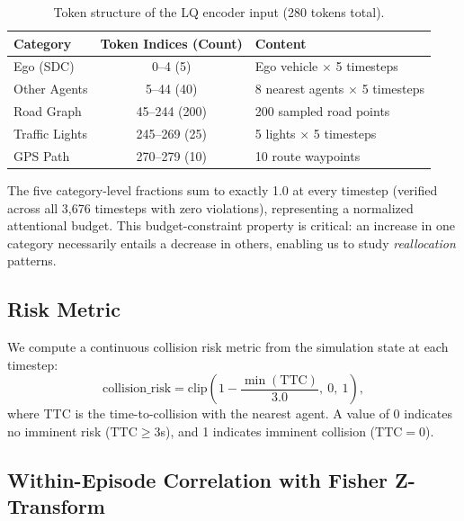 \documentclass[10pt]{article} %
\begin{document}
\begin{table}[ht]
    \caption{Token structure of the LQ encoder input (280 tokens total).}
    \label{tab:tokens}
    \begin{center}
    \begin{tabular}{lcl}
        \toprule
        \textbf{Category} & \textbf{Token Indices (Count)} & \textbf{Content} \\
        \midrule
        Ego (SDC) & 0--4 \hspace{0.5em}(5) & Ego vehicle $\times$ 5 timesteps \\
        Other Agents & 5--44 \hspace{0.3em}(40) & 8 nearest agents $\times$ 5 timesteps \\
        Road Graph & 45--244 (200) & 200 sampled road points \\
        Traffic Lights & 245--269 (25) & 5 lights $\times$ 5 timesteps \\
        GPS Path & 270--279 (10) & 10 route waypoints \\
        \bottomrule
    \end{tabular}
    \end{center}
\end{table}

The five category-level fractions sum to exactly 1.0 at every timestep (verified across all 3,676 timesteps with zero violations), representing a normalized attentional budget. This budget-constraint property is critical: an increase in one category necessarily entails a decrease in others, enabling us to study \textit{reallocation} patterns.

\subsection{Risk Metric}
\label{sec:risk}

We compute a continuous collision risk metric from the simulation state at each timestep:
\begin{equation}
    \mathrm{collision\_risk} = \mathrm{clip}\!\left(1 - \frac{\min(\mathrm{TTC})}{3.0},\ 0,\ 1\right),
\end{equation}
where TTC is the time-to-collision with the nearest agent. A value of 0 indicates no imminent risk ($\mathrm{TTC} \geq 3$s), and 1 indicates imminent collision ($\mathrm{TTC}{=}0$).

\subsection{Within-Episode Correlation with Fisher Z-Transform}
\label{sec:fisher}
\end{document}
